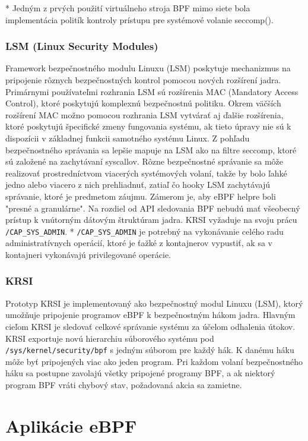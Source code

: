 * Jedným z prvých použití virtuálneho stroja BPF mimo siete bola implementácia politík kontroly prístupu pre systémové volanie seccomp().

\subsubsection{LSM (Linux Security Modules)}
Framework bezpečnostného modulu Linuxu (LSM) poskytuje mechanizmus na pripojenie rôznych bezpečnostných kontrol pomocou nových rozšírení jadra. 
Primárnymi používateľmi rozhrania LSM sú rozšírenia MAC (Mandatory Access Control), ktoré poskytujú komplexnú bezpečnostnú politiku. 
Okrem väčších rozšírení MAC možno pomocou rozhrania LSM vytvárať aj ďalšie rozšírenia, ktoré poskytujú špecifické zmeny fungovania systému, 
ak tieto úpravy nie sú k dispozícii v základnej funkcii samotného systému Linux. Z pohľadu bezpečnostného správania sa lepšie mapuje na LSM ako na 
filtre seccomp, ktoré sú založené na zachytávaní syscallov. Rôzne bezpečnostné správanie sa môže realizovať prostredníctvom viacerých systémových volaní, 
takže by bolo ľahké jedno alebo viacero z nich prehliadnuť, zatiaľ čo hooky LSM zachytávajú správanie, ktoré je predmetom záujmu. 
Zámerom je, aby eBPF helpre boli "presné a granulárne". Na rozdiel od API sledovania BPF nebudú mať všeobecný prístup k vnútorným dátovým štruktúram jadra. 
KRSI vyžaduje na svoju prácu \texttt{/CAP\_SYS\_ADMIN}.
* \texttt{/CAP\_SYS\_ADMIN} je potrebný na vykonávanie celého radu administratívnych operácií, ktoré je ťažké z kontajnerov vypustiť, 
ak sa v kontajneri vykonávajú privilegované operácie.

\subsubsection{KRSI}
Prototyp KRSI je implementovaný ako bezpečnostný modul Linuxu (LSM), ktorý umožňuje pripojenie programov eBPF k bezpečnostným hákom jadra.
Hlavným cieľom KRSI je sledovať celkové správanie systému za účelom odhalenia útokov. 
KRSI exportuje novú hierarchiu súborového systému pod \texttt{/sys/kernel/security/bpf} s jedným súborom pre každý hák.
K danému háku môže byť pripojených viac ako jeden program.
Pri každom volaní bezpečnostného háku sa postupne zavolajú všetky pripojené programy BPF, a ak niektorý program BPF vráti chybový stav, 
požadovaná akcia sa zamietne.

\section{Aplikácie eBPF}
